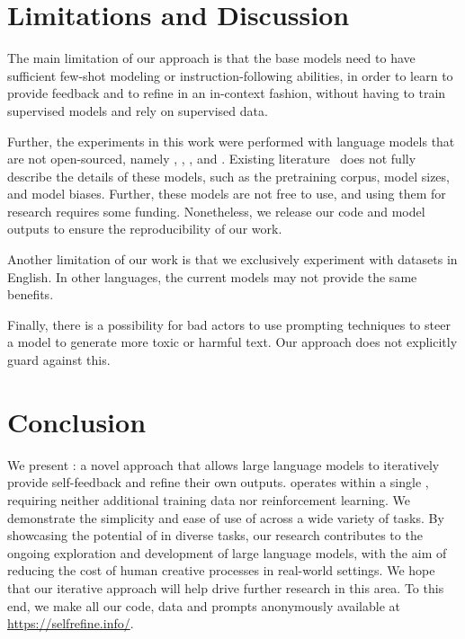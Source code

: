 


\section{Limitations and Discussion}
The main limitation of our approach is that the base models need to have sufficient few-shot modeling or instruction-following abilities, in order to learn to provide feedback and to refine in an in-context fashion, without having to train supervised models and rely on supervised data.

Further, the experiments in this work were performed with language models that are not open-sourced, namely \gptt, \chatgpt, \gptf, and \codex. 
Existing literature~\citep{Ouyang2022TrainingLM} does not fully describe the details of these models, such as the pretraining corpus, model sizes, and model biases.
Further, these models are not free to use, and using them for research requires some funding.
Nonetheless, we release our code and model outputs to ensure the reproducibility of our work. 


Another limitation of our work is that we exclusively experiment with datasets in English. In other languages, the current models may not provide the same benefits.

Finally, there is a possibility for bad actors to use prompting techniques to steer a model to generate more toxic or harmful text. Our approach does not explicitly guard against this.


\section{Conclusion}





We present \ours: a novel approach that allows large language models to  iteratively provide self-feedback and refine their own outputs.
\ours %
operates within a single \llm, requiring neither additional training data nor reinforcement learning. 
We demonstrate the simplicity and ease of use of \ours 
across a wide variety of tasks. %
By showcasing the potential of \ours in diverse tasks, our research contributes to the ongoing exploration and development of large language models, with the aim of reducing the cost of human creative processes in real-world settings.
We hope that our iterative approach %
will help drive further research in this area.
To this end, we make all our code, data and prompts anonymously available at 
\url{https://selfrefine.info/}. 

